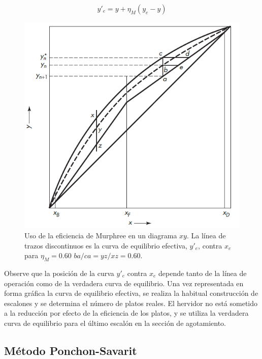 \documentclass[11pt]{book}
\begin{document}
\begin{equation}
    \label{eq:EficienciaMurphree_Y}
    y'_e = y + \eta_M (y_e - y)
\end{equation}

\begin{figure}[H]
    \centering
    \includegraphics{img/destilacion/EficienciaMurphree_Destilacion.PNG}
    \caption{Uso de la eficiencia de Murphree en un diagrama $xy$. La línea de trazos discontinuos es la curva de equilibrio efectiva, $y'_e$, contra $x_e$ para $\eta_M = 0.60$ $ba/ca = yz/xz = 0.60$.}
    \label{fig:EficienciaMurphree_Destilacion}
\end{figure}

Observe que la posición de la curva $y'_e$ contra $x_e$ depende tanto de la línea de operación como de la verdadera curva de equilibrio. Una vez representada en forma gráfica la curva de equilibrio efectiva, se realiza la habitual construcción de escalones y se determina el número de platos reales. El hervidor no está sometido a la reducción por efecto de la eficiencia de los platos, y se utiliza la verdadera curva de equilibrio para el último escalón en la sección de agotamiento.



\subsection{Método Ponchon-Savarit}
\end{document}
